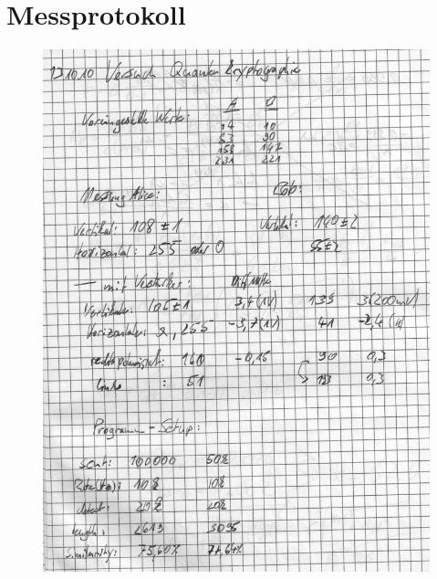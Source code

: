 \onecolumn
\section{Messprotokoll}
\label{sec:protokoll}
\begin{figure}[!ht]
        \centering
        \includegraphics[page=1,width=.88\textwidth,keepaspectratio]{../data/messprotokoll}
        \label{fig:protokoll}
\end{figure}